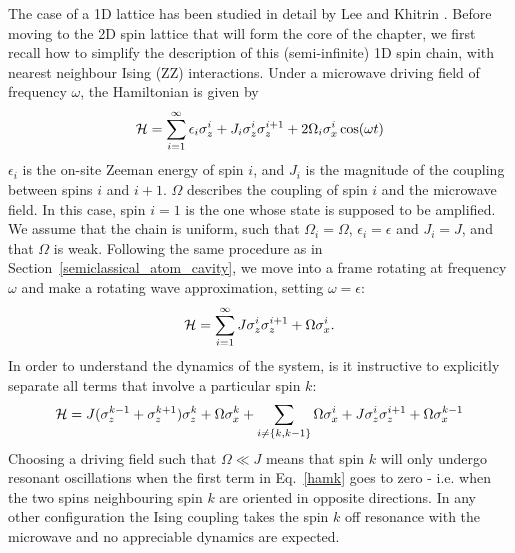 The case of a 1D lattice has been studied in detail by Lee and Khitrin \cite{Lee:2005p6468}. Before moving to the 2D spin lattice that will form the core of the chapter, we first recall how to simplify the description of this (semi-infinite) 1D spin chain, with nearest neighbour Ising (ZZ) interactions. Under a microwave driving field of frequency $\omega$, the Hamiltonian is given by
\begin{equation} {\cal H} = \sum_{i=1}^{\infty} \epsilon_i \sigma^i_z
  + J_i \sigma_z^i\sigma_z^{i+1} + 2 \Omega_i \sigma_x^i \cos(\omega
  t)
\end{equation}
$\epsilon_i$ is the on-site Zeeman energy of spin $i$, and $J_i$ is the magnitude of the coupling between spins $i$ and $i+1$. $\Omega$ describes the coupling of spin $i$ and the microwave field. In this case, spin $i=1$ is the one whose state is supposed to be amplified. We assume that the chain is uniform, such that $\Omega_i = \Omega$, $\epsilon_i = \epsilon$ and $J_i = J$, and that $\Omega$ is weak. Following the same procedure as in Section~\ref{semiclassical_atom_cavity}, we move into a frame rotating at frequency $\omega$ and make a rotating wave approximation, setting $\omega = \epsilon$:
\begin{equation} {\cal H} = \sum_{i=1}^{\infty} J
  \sigma_z^i\sigma_z^{i+1} + \Omega \sigma_x^i .
\end{equation}
In order to understand the dynamics of the system, is it instructive to explicitly separate all terms that involve a particular spin $k$:
\begin{equation} {\cal H} = J (\sigma_z^{k-1} +
  \sigma_z^{k+1})\sigma_z^k + \Omega \sigma^k_x + \sum_{i \neq \{k,
  k-1\}} \Omega\sigma_x^i + J \sigma_z^i\sigma_z^{i+1} +
  \Omega\sigma_x^{k-1}
  \label{hamk}
\end{equation}
Choosing a driving field such that $\Omega\ll J$ means that spin $k$ will only undergo resonant oscillations when the first term in Eq.~\ref{hamk} goes to zero - i.e. when the two spins neighbouring spin $k$ are oriented in opposite directions. In any other configuration the Ising coupling takes the spin $k$ off resonance with the microwave and no appreciable dynamics are expected.

